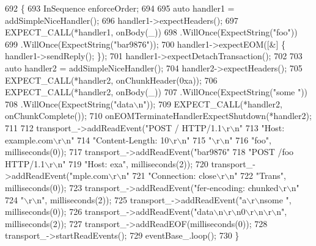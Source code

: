\begin{DoxyCode}
692                                                 \{
693   InSequence enforceOrder;
694 
695   \textcolor{keyword}{auto} handler1 = addSimpleNiceHandler();
696   handler1->expectHeaders();
697   EXPECT\_CALL(*handler1, onBody(\_))
698     .WillOnce(ExpectString(\textcolor{stringliteral}{"foo"}))
699     .WillOnce(ExpectString(\textcolor{stringliteral}{"bar9876"}));
700   handler1->expectEOM([&] \{ handler1->sendReply(); \});
701   handler1->expectDetachTransaction();
702 
703   \textcolor{keyword}{auto} handler2 = addSimpleNiceHandler();
704   handler2->expectHeaders();
705   EXPECT\_CALL(*handler2, onChunkHeader(0xa));
706   EXPECT\_CALL(*handler2, onBody(\_))
707     .WillOnce(ExpectString(\textcolor{stringliteral}{"some "}))
708     .WillOnce(ExpectString(\textcolor{stringliteral}{"data\(\backslash\)n"}));
709   EXPECT\_CALL(*handler2, onChunkComplete());
710   onEOMTerminateHandlerExpectShutdown(*handler2);
711 
712   transport\_->addReadEvent(\textcolor{stringliteral}{"POST / HTTP/1.1\(\backslash\)r\(\backslash\)n"}
713                            \textcolor{stringliteral}{"Host: example.com\(\backslash\)r\(\backslash\)n"}
714                            \textcolor{stringliteral}{"Content-Length: 10\(\backslash\)r\(\backslash\)n"}
715                            \textcolor{stringliteral}{"\(\backslash\)r\(\backslash\)n"}
716                            \textcolor{stringliteral}{"foo"}, milliseconds(0));
717   transport\_->addReadEvent(\textcolor{stringliteral}{"bar9876"}
718                            \textcolor{stringliteral}{"POST /foo HTTP/1.1\(\backslash\)r\(\backslash\)n"}
719                            \textcolor{stringliteral}{"Host: exa"}, milliseconds(2));
720   transport\_->addReadEvent(\textcolor{stringliteral}{"mple.com\(\backslash\)r\(\backslash\)n"}
721                            \textcolor{stringliteral}{"Connection: close\(\backslash\)r\(\backslash\)n"}
722                            \textcolor{stringliteral}{"Trans"}, milliseconds(0));
723   transport\_->addReadEvent(\textcolor{stringliteral}{"fer-encoding: chunked\(\backslash\)r\(\backslash\)n"}
724                            \textcolor{stringliteral}{"\(\backslash\)r\(\backslash\)n"}, milliseconds(2));
725   transport\_->addReadEvent(\textcolor{stringliteral}{"a\(\backslash\)r\(\backslash\)nsome "}, milliseconds(0));
726   transport\_->addReadEvent(\textcolor{stringliteral}{"data\(\backslash\)n\(\backslash\)r\(\backslash\)n0\(\backslash\)r\(\backslash\)n\(\backslash\)r\(\backslash\)n"}, milliseconds(2));
727   transport\_->addReadEOF(milliseconds(0));
728   transport\_->startReadEvents();
729   eventBase\_.loop();
730 \}
\end{DoxyCode}
